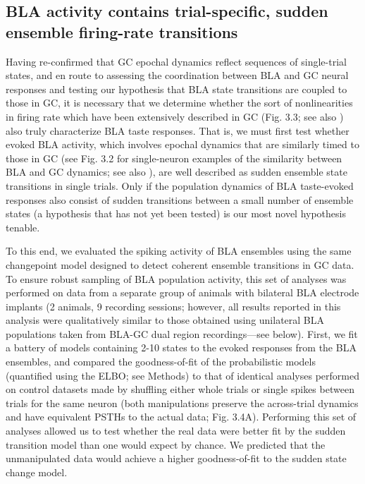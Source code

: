 \begin{refsection}
\subsection{BLA activity contains trial-specific, sudden ensemble firing-rate transitions}
Having re-confirmed that GC epochal dynamics reflect sequences of single-trial states, and en route to assessing the coordination between BLA and GC neural responses and testing our hypothesis that BLA state transitions are coupled to those in GC, it is necessary that we determine whether the sort of nonlinearities in firing rate which have been extensively described in GC (Fig. 3.3; see also \cite{jones2007a,sadacca2016a}) also truly characterize BLA taste responses. That is, we must first test whether evoked BLA activity, which involves epochal dynamics that are similarly timed to those in GC (see Fig. 3.2 for single-neuron examples of the similarity between BLA and GC dynamics; see also \cite{fontanini2009a}), are well described as sudden ensemble state transitions in single trials. Only if the population dynamics of BLA taste-evoked responses also consist of sudden transitions between a small number of ensemble states (a hypothesis that has not yet been tested) is our most novel hypothesis tenable.

To this end, we evaluated the spiking activity of BLA ensembles using the same changepoint model designed to detect coherent ensemble transitions in GC data. To ensure robust sampling of BLA population activity, this set of analyses was performed on data from a separate group of animals with bilateral BLA electrode implants (2 animals, 9 recording sessions; however, all results reported in this analysis were qualitatively similar to those obtained using unilateral BLA populations taken from BLA-GC dual region recordings—see below). First, we fit a battery of models containing 2-10 states to the evoked responses from the BLA ensembles, and compared the goodness-of-fit of the probabilistic models (quantified using the ELBO; see Methods) to that of identical analyses performed on control datasets made by shuffling either whole trials or single spikes between trials for the same neuron (both manipulations preserve the across-trial dynamics and have equivalent PSTHs to the actual data; Fig. 3.4A). Performing this set of analyses allowed us to test whether the real data were better fit by the sudden transition model than one would expect by chance. We predicted that the unmanipulated data would achieve a higher goodness-of-fit to the sudden state change model.


\end{refsection}
